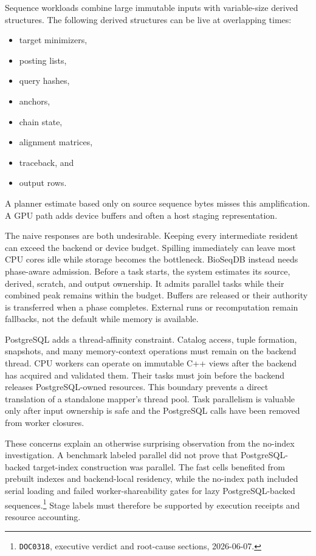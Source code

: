 Sequence workloads combine large immutable inputs with variable-size
derived structures.  The following derived structures can be live at
overlapping times:
\begin{itemize}
  \setlength{\itemsep}{0pt}
  \setlength{\parsep}{0pt}
  \item target minimizers,
  \item posting lists,
  \item query hashes,
  \item anchors,
  \item chain state,
  \item alignment matrices,
  \item traceback, and
  \item output rows.
\end{itemize}
A planner estimate based only on source sequence bytes misses this
amplification.  A GPU path adds device buffers and often a host staging
representation.

The naive responses are both undesirable.  Keeping every intermediate
resident can exceed the backend or device budget.  Spilling immediately
can leave most CPU cores idle while storage becomes the bottleneck.
BioSeqDB instead needs phase-aware admission.  Before a task starts, the
system estimates its source, derived, scratch, and output ownership.  It
admits parallel tasks while their combined peak remains within the
budget.  Buffers are released or their authority is transferred when a
phase completes.  External runs or recomputation remain fallbacks, not
the default while memory is available.

PostgreSQL adds a thread-affinity constraint.  Catalog access, tuple
formation, snapshots, and many memory-context operations must remain on
the backend thread.  CPU workers can operate on immutable C++ views after
the backend has acquired and validated them.  Their tasks must join
before the backend releases PostgreSQL-owned resources.  This boundary
prevents a direct translation of a standalone mapper's thread pool.
Task parallelism is valuable only after input ownership is safe and the
PostgreSQL calls have been removed from worker closures.

These concerns explain an otherwise surprising observation from the
no-index investigation.  A benchmark labeled parallel did not prove that
PostgreSQL-backed target-index construction was parallel.  The fast cells
benefited from prebuilt indexes and backend-local residency, while the
no-index path included serial loading and failed worker-shareability
gates for lazy PostgreSQL-backed sequences.\footnote{\texttt{DOC0318},
executive verdict and root-cause sections, 2026-06-07.}  Stage labels
must therefore be supported by execution receipts and resource
accounting.

